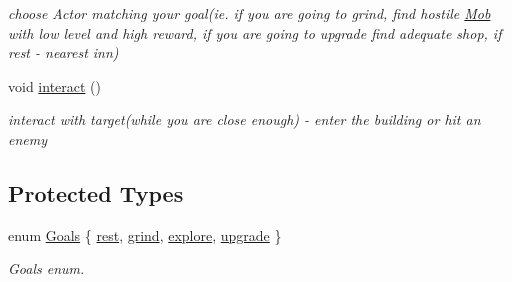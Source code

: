 \begin{DoxyCompactItemize}
\begin{DoxyCompactList}\small\item\em choose Actor matching your goal(ie. if you are going to grind, find hostile \hyperlink{class_mob}{Mob} with low level and high reward, if you are going to upgrade find adequate shop, if rest -\/ nearest inn) \end{DoxyCompactList}\item 
void \hyperlink{class_mob_af89dfe24c4bea6d4fea6affd0b752c04}{interact} ()\hypertarget{class_mob_af89dfe24c4bea6d4fea6affd0b752c04}{}\label{class_mob_af89dfe24c4bea6d4fea6affd0b752c04}

\begin{DoxyCompactList}\small\item\em interact with target(while you are close enough) -\/ enter the building or hit an enemy \end{DoxyCompactList}\end{DoxyCompactItemize}
\subsection*{Protected Types}
\begin{DoxyCompactItemize}
\item 
enum \hyperlink{class_mob_a886346a9f913203df0797f2c84dd8962}{Goals} \{ \hyperlink{class_mob_a886346a9f913203df0797f2c84dd8962a3d18c0a90658cc4872eed0afe28790b4}{rest}, 
\hyperlink{class_mob_a886346a9f913203df0797f2c84dd8962aa72b321b37507255070e236e133616f9}{grind}, 
\hyperlink{class_mob_a886346a9f913203df0797f2c84dd8962a114d85e85d882dd8bf2be34208450b6c}{explore}, 
\hyperlink{class_mob_a886346a9f913203df0797f2c84dd8962ac9be3f62a039d2a4c5a63146a03a307d}{upgrade}
 \}\begin{DoxyCompactList}\small\item\em Goals enum. \end{DoxyCompactList}
\end{DoxyCompactItemize}
